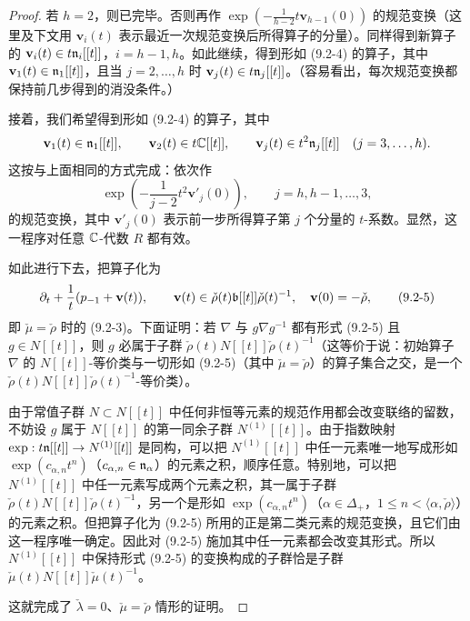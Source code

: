 \begin{proof}
若 $h=2$，则已完毕。否则再作 $\exp(-\frac{1}{h-2}t\mathbf{v}_{h-1}(0))$ 的规范变换（这里及下文用 $\mathbf{v}_i(t)$ 表示最近一次规范变换后所得算子的分量）。同样得到新算子的 $\mathbf{v}_i(t)\in t\mathfrak{n}_i[[t]]$，$i=h-1,h$。如此继续，得到形如 (9.2-4) 的算子，其中 $\mathbf{v}_1(t)\in\mathfrak{n}_1[[t]]$，且当 $j=2,\dots,h$ 时 $\mathbf{v}_j(t)\in t\mathfrak{n}_j[[t]]$。（容易看出，每次规范变换都保持前几步得到的消没条件。）

接着，我们希望得到形如 (9.2-4) 的算子，其中
\[
\mathbf{v}_1(t)\in\mathfrak{n}_1[[t]],\qquad \mathbf{v}_2(t)\in t\mathbb{C}[[t]],\qquad
\mathbf{v}_j(t)\in t^2\mathfrak{n}_j[[t]]\quad (j=3,\dots,h).
\]
这按与上面相同的方式完成：依次作
\[
\exp\left(-\frac{1}{j-2}t^2\mathbf{v}'_j(0)\right),\qquad j=h,h-1,\dots,3,
\]
的规范变换，其中 $\mathbf{v}'_j(0)$ 表示前一步所得算子第 $j$ 个分量的 $t$-系数。显然，这一程序对任意 $\mathbb{C}$-代数 $R$ 都有效。

如此进行下去，把算子化为
\begin{equation}
\partial_t + \frac{1}{t}(p_{-1}+\mathbf{v}(t)),\qquad
\mathbf{v}(t)\in\check\rho(t)\mathfrak{b}[[t]]\check\rho(t)^{-1},\quad \mathbf{v}(0)=-\check\rho,
\tag{9.2-5}
\end{equation}
即 $\check\mu=\check\rho$ 时的 (9.2-3)。下面证明：若 $\nabla$ 与 $g\nabla g^{-1}$ 都有形式 (9.2-5) 且 $g\in N[[t]]$，则 $g$ 必属于子群 $\check\rho(t)N[[t]]\check\rho(t)^{-1}$（这等价于说：初始算子 $\nabla$ 的 $N[[t]]$-等价类与一切形如 (9.2-5)（其中 $\check\mu=\check\rho$）的算子集合之交，是一个 $\check\rho(t)N[[t]]\check\rho(t)^{-1}$-等价类）。

由于常值子群 $N\subset N[[t]]$ 中任何非恒等元素的规范作用都会改变联络的留数，不妨设 $g$ 属于 $N[[t]]$ 的第一同余子群 $N^{(1)}[[t]]$。由于指数映射 $\exp: t\mathfrak{n}[[t]]\to N^{(1)}[[t]]$ 是同构，可以把 $N^{(1)}[[t]]$ 中任一元素唯一地写成形如 $\exp(c_{\alpha,n}t^n)$（$c_{\alpha,n}\in\mathfrak{n}_\alpha$）的元素之积，顺序任意。特别地，可以把 $N^{(1)}[[t]]$ 中任一元素写成两个元素之积，其一属于子群 $\check\rho(t)N[[t]]\check\rho(t)^{-1}$，另一个是形如 $\exp(c_{\alpha,n}t^n)$（$\alpha\in\Delta_+$，$1\le n<\langle\alpha,\check\rho\rangle$）的元素之积。但把算子化为 (9.2-5) 所用的正是第二类元素的规范变换，且它们由这一程序唯一确定。因此对 (9.2-5) 施加其中任一元素都会改变其形式。所以 $N^{(1)}[[t]]$ 中保持形式 (9.2-5) 的变换构成的子群恰是子群 $\check\mu(t)N[[t]]\check\mu(t)^{-1}$。

这就完成了 $\check\lambda=0$、$\check\mu=\check\rho$ 情形的证明。


\end{proof}
